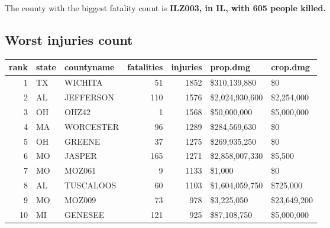 \documentclass[]{article}
\newenvironment{Shaded}{\begin{snugshade}}{\end{snugshade}}
\newcommand{\KeywordTok}[1]{\textcolor[rgb]{0.13,0.29,0.53}{\textbf{{#1}}}}
\newcommand{\DataTypeTok}[1]{\textcolor[rgb]{0.13,0.29,0.53}{{#1}}}
\newcommand{\DecValTok}[1]{\textcolor[rgb]{0.00,0.00,0.81}{{#1}}}
\newcommand{\StringTok}[1]{\textcolor[rgb]{0.31,0.60,0.02}{{#1}}}
\newcommand{\CommentTok}[1]{\textcolor[rgb]{0.56,0.35,0.01}{\textit{{#1}}}}
\newcommand{\NormalTok}[1]{{#1}}
\begin{document}
The county with the biggest fatality count is \textbf{ILZ003, in IL,
with 605 people killed.}

\subsection{Worst injuries count}\label{worst-injuries-count}

\begin{Shaded}
\end{Shaded}

\begin{longtable}[]{@{}rllrrll@{}}
\toprule
rank & state & countyname & fatalities & injuries & prop.dmg &
crop.dmg\tabularnewline
\midrule
\endhead
1 & TX & WICHITA & 51 & 1852 & \$310,139,880 & \$0\tabularnewline
2 & AL & JEFFERSON & 110 & 1576 & \$2,024,930,600 &
\$2,254,000\tabularnewline
3 & OH & OHZ42 & 1 & 1568 & \$50,000,000 & \$5,000,000\tabularnewline
4 & MA & WORCESTER & 96 & 1289 & \$284,569,630 & \$0\tabularnewline
5 & OH & GREENE & 37 & 1275 & \$269,935,250 & \$0\tabularnewline
6 & MO & JASPER & 165 & 1271 & \$2,858,007,330 & \$5,500\tabularnewline
7 & MO & MOZ061 & 9 & 1133 & \$1,000 & \$0\tabularnewline
8 & AL & TUSCALOOS & 60 & 1103 & \$1,604,059,750 &
\$725,000\tabularnewline
9 & MO & MOZ009 & 73 & 978 & \$3,225,050 & \$23,649,200\tabularnewline
10 & MI & GENESEE & 121 & 925 & \$87,108,750 &
\$5,000,000\tabularnewline
\bottomrule
\end{longtable}

\begin{Shaded}
\end{Shaded}
\end{document}
